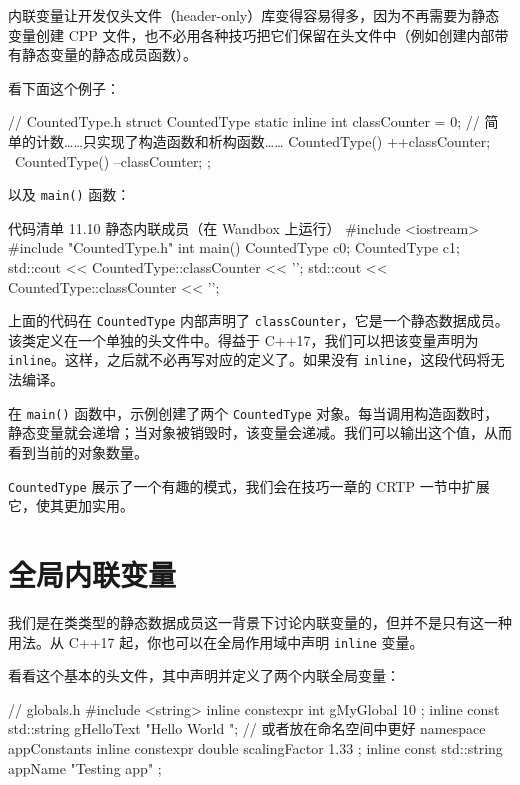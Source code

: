 内联变量让开发仅头文件（header-only）库变得容易得多，因为不再需要为静态变量创建 CPP 文件，也不必用各种技巧把它们保留在头文件中（例如创建内部带有静态变量的静态成员函数）。

看下面这个例子：

\begin{codebox}[cpp]
// CountedType.h
struct CountedType {
static inline int classCounter = 0;
// 简单的计数……只实现了构造函数和析构函数……
CountedType() { ++classCounter; }
~CountedType() { --classCounter; }
};
\end{codebox}

以及 \texttt{main()} 函数：

\begin{codeboxt}[cpp]{代码清单 11.10 静态内联成员（在 Wandbox 上运行）}
#include <iostream>
#include "CountedType.h"
int main() {
{
CountedType c0;
CountedType c1;
std::cout << CountedType::classCounter << '\n';
}
std::cout << CountedType::classCounter << '\n';
}
\end{codeboxt}

上面的代码在 \texttt{CountedType} 内部声明了 \texttt{classCounter}，它是一个静态数据成员。该类定义在一个单独的头文件中。得益于 C++17，我们可以把该变量声明为 \texttt{inline}。这样，之后就不必再写对应的定义了。如果没有 \texttt{inline}，这段代码将无法编译。

在 \texttt{main()} 函数中，示例创建了两个 \texttt{CountedType} 对象。每当调用构造函数时，静态变量就会递增；当对象被销毁时，该变量会递减。我们可以输出这个值，从而看到当前的对象数量。


\begin{myInfoBox}
\texttt{CountedType} 展示了一个有趣的模式，我们会在技巧一章的 CRTP 一节中扩展它，使其更加实用。
\end{myInfoBox}

\section{全局内联变量}

我们是在类类型的静态数据成员这一背景下讨论内联变量的，但并不是只有这一种用法。从 C++17 起，你也可以在全局作用域中声明 \texttt{inline} 变量。

看看这个基本的头文件，其中声明并定义了两个内联全局变量：

\begin{codebox}[cpp]
// globals.h
#include <string>
inline constexpr int gMyGlobal { 10 };
inline const std::string gHelloText {"Hello World "};
// 或者放在命名空间中更好
namespace appConstants {
inline constexpr double scalingFactor { 1.33 };
inline const std::string appName { "Testing app" };
}
\end{codebox}

